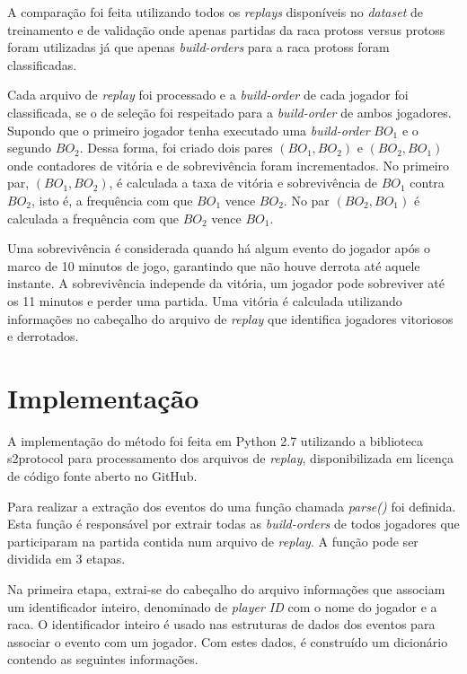 A comparação foi feita utilizando todos os \textit{\glspl{replay}} disponíveis no \textit{dataset} de treinamento e de validação onde apenas partidas da \gls{raca} \gls{protoss} versus \gls{protoss} foram utilizadas já que apenas \textit{\glspl{build-order}} para a \gls{raca} \gls{protoss} foram classificadas.

Cada arquivo de \textit{\gls{replay}} foi processado e a \textit{\gls{build-order}} de cada jogador foi classificada, se o  de seleção foi respeitado para a \textit{\gls{build-order}} de ambos jogadores. Supondo que o primeiro jogador tenha executado uma \textit{\gls{build-order}} $BO_1$ e o segundo $BO_2$. Dessa forma, foi criado dois pares $(BO_1, BO_2)$ e $(BO_2, BO_1)$ onde contadores de vitória e de sobrevivência foram incrementados. No primeiro par, $(BO_1, BO_2)$, é calculada a taxa de vitória e sobrevivência de $BO_1$ contra $BO_2$, isto é, a frequência com que $BO_1$ vence $BO_2$. No par $(BO_2, BO_1)$ é calculada a frequência com que $BO_2$ vence $BO_1$.

Uma sobrevivência é considerada quando há algum evento do jogador após o marco de 10 minutos de jogo, garantindo que não houve derrota até aquele instante. A sobrevivência independe da vitória, um jogador pode sobreviver até os 11 minutos e perder uma partida. Uma vitória é calculada utilizando informações no cabeçalho do arquivo de \textit{\gls{replay}} que identifica jogadores vitoriosos e derrotados.
 
		\section{Implementação}

A implementação do método foi feita em Python 2.7 utilizando a biblioteca s2protocol \cite{s2protocol} para processamento dos arquivos de \textit{\gls{replay}}, disponibilizada em licença de código fonte aberto no GitHub.

Para realizar a extração dos eventos do uma função chamada \textit{\textit{parse()}} foi definida. Esta função é responsável por extrair todas as \textit{\glspl{build-order}} de todos jogadores que participaram na partida contida num arquivo de \textit{\gls{replay}}. A função pode ser dividida em 3 etapas.

Na primeira etapa, extrai-se do cabeçalho do arquivo informações que associam um identificador inteiro, denominado de \textit{player ID} com o nome do jogador e a \gls{raca}. O identificador inteiro é usado nas estruturas de dados dos eventos para associar o evento com um jogador. Com estes dados, é construído um dicionário contendo as seguintes informações.

